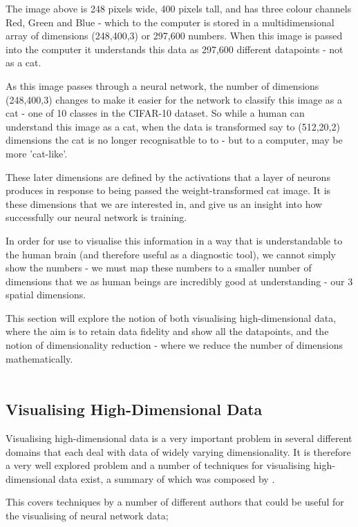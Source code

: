 \documentclass[a4paper,11pt,titlepage]{article}
\begin{document}
	The image above is 248 pixels wide, 400 pixels tall, and has three colour channels Red, Green and Blue - which to the computer is stored in a multidimensional array of dimensions (248,400,3) or 297,600 numbers. When this image is passed into the computer it understands this data as 297,600 different datapoints - not as a cat.
	\par 
	As this image passes through a neural network, the number of dimensions (248,400,3) changes to make it easier for the network to classify this image as a cat - one of 10 classes in the CIFAR-10 dataset. So while a human can understand this image as a cat, when the data is transformed say to (512,20,2) dimensions the cat is no longer recognisatble to to - but to a computer, may be more 'cat-like'.
	\par 
	These later dimensions are defined by the activations that a layer of neurons produces in response to being passed the weight-transformed cat image. It is these dimensions that we are interested in, and give us an insight into how successfully our neural network is training. 
	\par 
	In order for use to visualise this information in a way that is understandable to the human brain (and therefore useful as a diagnostic tool), we cannot simply show the numbers - we must map these numbers to a smaller number of dimensions that we as human beings are incredibly good at understanding - our 3 spatial dimensions. 
	\par 
	This section will explore the notion of both visualising high-dimensional data, where the aim is to retain data fidelity and show all the datapoints, and the notion of dimensionality reduction - where we reduce the number of dimensions mathematically.
\\\
\subsection{Visualising High-Dimensional Data}
	Visualising high-dimensional data is a very important problem in several different domains that each deal with data of widely varying dimensionality. It is therefore a very well explored problem and a number of techniques for visualising high-dimensional data exist, a summary of which was composed by \cite{Cristina2003}.
	\par 
	This covers techniques by a number of different authors that could be useful for the visualising of neural network data;	
		\par
		
\end{document}
